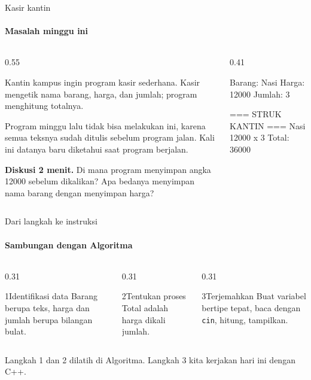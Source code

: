 \documentclass[t]{beamer}
\begin{document}

\begin{frame}[fragile]{Kasir kantin}
\framesubtitle{Masalah minggu ini}
\begin{columns}[T]
\begin{column}{0.55\textwidth}
{\small Kantin kampus ingin program kasir sederhana. Kasir mengetik nama barang, harga, dan jumlah; program menghitung totalnya.

\vspace{6pt}
Program minggu lalu tidak bisa melakukan ini, karena semua teksnya sudah ditulis sebelum program jalan. Kali ini datanya baru diketahui saat program berjalan.\par}
\vspace{6pt}
\begin{Catatan}
\textbf{Diskusi 2 menit.} Di mana program menyimpan angka 12000 sebelum dikalikan? Apa bedanya menyimpan nama barang dengan menyimpan harga?
\end{Catatan}
\end{column}
\begin{column}{0.41\textwidth}
\begin{Keluaran}[]
Barang: Nasi
Harga: 12000
Jumlah: 3

=== STRUK KANTIN ===
Nasi
12000 x 3
Total: 36000
\end{Keluaran}
\end{column}
\end{columns}
\end{frame}

\begin{frame}{Dari langkah ke instruksi}
\framesubtitle{Sambungan dengan Algoritma}
\begin{columns}[T]
\begin{column}{0.31\textwidth}
\begin{Langkah}{1}{Identifikasi data}
Barang berupa teks, harga dan jumlah berupa bilangan bulat.
\end{Langkah}
\end{column}
\begin{column}{0.31\textwidth}
\begin{Langkah}{2}{Tentukan proses}
Total adalah harga dikali jumlah.
\end{Langkah}
\end{column}
\begin{column}{0.31\textwidth}
\begin{Langkah}{3}{Terjemahkan}
Buat variabel bertipe tepat, baca dengan \texttt{cin}, hitung, tampilkan.
\end{Langkah}
\end{column}
\end{columns}
\vspace{10pt}
Langkah 1 dan 2 dilatih di Algoritma. Langkah 3 kita kerjakan hari ini dengan C++.
\end{frame}
\end{document}
